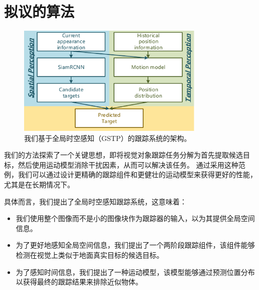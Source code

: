 \section{拟议的算法}
\label{sec:method}

\begin{figure}[t]
	\centering
    \includegraphics[width=0.8\textwidth]{Img/globally/Arch7.pdf}
    \caption{我们基于全局时空感知（GSTP）的跟踪系统的架构。}
    \label{fig:arch}
\end{figure}

我们的方法探索了一个关键思想，即将视觉对象跟踪任务分解为首先提取候选目标，然后使用运动模型消除干扰因素，从而可以解决该任务。
通过采用这种范例，我们可以通过设计更精确的跟踪组件和更健壮的运动模型来获得更好的性能，尤其是在长期情况下。

具体而言，我们提出了全局时空感知跟踪系统，这意味着：
\begin{itemize}
\item 我们使用整个图像而不是小的图像块作为跟踪器的输入，以为其提供全局空间信息。
\item 为了更好地感知全局空间信息，我们提出了一个两阶段跟踪组件，该组件能够检测在视觉上类似于地面真实目标的候选目标。
\item 为了感知时间信息，我们提出了一种运动模型，该模型能够通过预测位置分布以获得最终的跟踪结果来排除近似物体。
\end{itemize}


